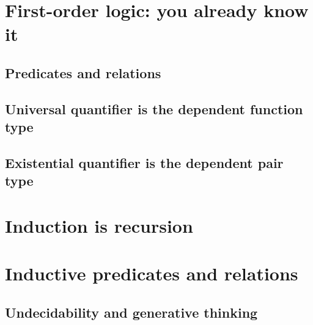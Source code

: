 \documentclass{beamer}
\begin{document}


\section{First-order logic: you already know it}

\subsection{Predicates and relations}

\subsection{Universal quantifier is the dependent function type}
\subsection{Existential quantifier is the dependent pair type}

\section{Induction is recursion}


\section{Inductive predicates and relations}

\subsection{Undecidability and generative thinking}
\end{document}
